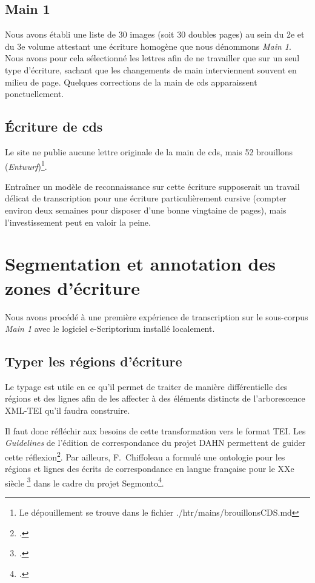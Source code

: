 \documentclass[a4paper,12pt,twoside]{book}
\begin{document}
			\subsection{Main 1}
			Nous avons établi une liste de 30 images (soit 30 doubles pages) au sein du 2e et du 3e volume attestant une écriture homogène que nous dénommons \textit{Main 1}. Nous avons pour cela sélectionné les lettres afin de ne travailler que sur un seul type d'écriture, sachant que les changements de main interviennent souvent en milieu de page. Quelques corrections de la main de \gls{cds} apparaissent ponctuellement.
		
			\subsection{Écriture de \gls{cds}}
			Le site ne publie aucune lettre originale de la main de \gls{cds}, mais 52 brouillons (\textit{Entwurf})\footnote{Le dépouillement se trouve dans le fichier \textsf{./htr/mains/brouillonsCDS.md}}.
		
			Entraîner un modèle de reconnaissance sur cette écriture supposerait un travail délicat de transcription pour une écriture particulièrement cursive (compter environ deux semaines pour disposer d'une bonne vingtaine de pages), mais l'investissement peut en valoir la peine.
		
		\section{Segmentation et annotation des zones d'écriture}
			Nous avons procédé à une première expérience de transcription sur le sous-corpus \textit{Main 1} avec le logiciel e-Scriptorium installé localement.
        
            \subsection{Typer les régions d'écriture}
            Le typage est utile en ce qu'il permet de traiter de manière différentielle des régions et des lignes afin de les affecter à des éléments distincts de l'arborescence XML-TEI qu'il faudra construire.
            
            Il faut donc réfléchir aux besoins de cette transformation vers le format TEI. Les \textit{Guidelines} de l'édition de correspondance du projet DAHN permettent de guider cette réflexion\footcite{chiffoleauCorrespondenceGuidelines2022}. Par ailleurs, F.~Chiffoleau a formulé une ontologie pour les régions et lignes des écrits de correspondance en langue française pour le XXe siècle \footcite{chiffoleauCorrespondanceLangueFrancaise2021} dans le cadre du projet \gls{Segmonto}\footcite{gabaySegmOntoCommonVocabulary2021}.
				        
\end{document}
